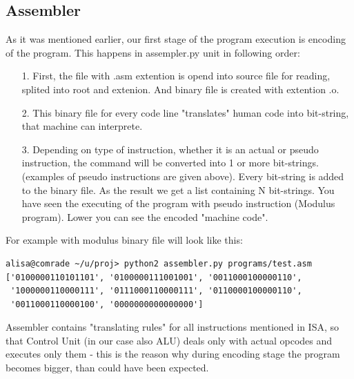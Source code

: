 \documentclass[11pt,a4paper]{article}
\begin{document}
\newpage
\subsection{Assembler}
As it was mentioned earlier, our first stage of the program execution is encoding of the program. This happens in assempler.py unit in following order:
\begin{enumerate}
	\item[1.] First, the file with .asm extention is opend into source file for reading, splited into root and extenion. And binary file is created with extention .o.
	\item[2.] This binary file for every code line	"translates" human code into bit-string, that machine can interprete.
	\item[3.] Depending on type of instruction, whether it is an actual or pseudo instruction, the command will be converted into 1 or more bit-strings. (examples of pseudo instructions are given above). Every bit-string is added to the binary file. As the result we get a list containing N bit-strings. You have seen the executing of the program with pseudo instruction (Modulus program). Lower you can see the encoded "machine code". 
\end{enumerate}
For example with modulus binary file will look like this:
\begin{verbatim}
alisa@comrade ~/u/proj> python2 assembler.py programs/test.asm
['0100000110101101', '0100000111001001', '0011000100000110',
 '1000000110000111', '0111000110000111', '0110000100000110',
 '0011000110000100', '0000000000000000']
\end{verbatim} 
Assembler contains "translating rules" for all instructions mentioned in ISA, so that Control Unit (in our case also ALU) deals only with actual opcodes and executes only them - this is the reason why during encoding stage the program becomes bigger, than could have been expected.\\
\end{document}
